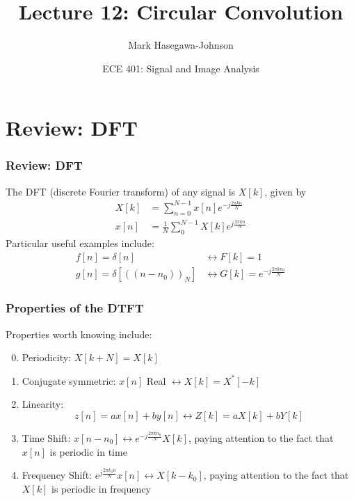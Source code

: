 \documentclass{beamer}
\title{Lecture 12: Circular Convolution}
\author{Mark Hasegawa-Johnson}
\date{ECE 401: Signal and Image Analysis}
\begin{document}
\begin{frame}
  \maketitle
\end{frame}

\begin{frame}
  \tableofcontents
\end{frame}

\section[Review]{Review: DFT}
\setcounter{subsection}{1}

\begin{frame}
  \frametitle{Review: DFT}

  The DFT (discrete Fourier transform) of any signal is
  $X[k]$, given by
  \begin{align*}
    X[k] &= \sum_{n=0}^{N-1} x[n]e^{-j\frac{2\pi kn}{N}}\\
    x[n] &= \frac{1}{N}\sum_0^{N-1} X[k]e^{j\frac{2\pi kn}{N}}
  \end{align*}
  Particular useful examples include:
  \begin{align*}
    f[n]=\delta[n] &\leftrightarrow F[k]=1\\
    g[n]=\delta\left[(\!(n-n_0)\!)_N\right] &\leftrightarrow G[k]=e^{-j\frac{2\pi kn_0}{N}}
  \end{align*}
\end{frame}

\begin{frame}
  \frametitle{Properties of the DTFT}

  Properties worth knowing  include:
  \begin{enumerate}
    \setcounter{enumi}{-1}
  \item Periodicity: $X[k+N]=X[k]$
  \item Conjugate symmetric: $x[n]$ Real $\leftrightarrow X[k]=X^*[-k]$
  \item Linearity:
    \[z[n]=ax[n]+by[n]\leftrightarrow Z[k]=aX[k]+bY[k]
    \]
  \item Time Shift: $x[n-n_0]\leftrightarrow e^{-j\frac{2\pi
      kn_0}{N}}X[k]$, paying attention to the fact that $x[n]$ is
    periodic in time
  \item Frequency Shift: $e^{j\frac{2\pi k_0 n}{N}}x[n]\leftrightarrow
    X[k-k_0]$, paying attention to the fact that $X[k]$ is periodic
    in frequency
  \end{enumerate}
\end{frame}
\end{document}
